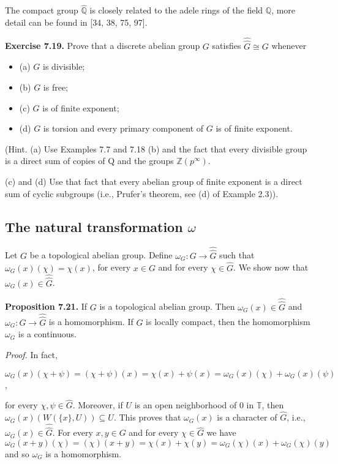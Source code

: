 \documentclass[12pt]{article}
\begin{document}
\begin{itemize}
\begin{itemize}
    The compact group $\hat{\mathbb{Q}}$ is closely related to the adele rings of the field $\mathbb{Q}$, more detail can be found in
[34, 38, 75, 97].
    

\textbf{Exercise 7.19.} Prove that a discrete abelian group $G$ satisfies $\hat{\hat{G}} \cong G$ whenever

\begin{itemize}

    \item (a) $G$ is divisible;

    \item (b) $G$ is free;

    \item (c) $G$ is of finite exponent;

    \item (d) $G$ is torsion and every primary component of $G$ is of finite exponent.

\end{itemize}

    (Hint. (a) Use Examples 7.7 and 7.18 (b) and the fact that every divisible group is a direct sum of copies of
Q and the groups $\mathbb{Z}(p^{\infty})$.


    (c) and (d) Use that fact that every abelian group of finite exponent is a direct sum of cyclic subgroups (i.e.,
Prufer's theorem, see (d) of Example 2.3)).


\subsection{The natural transformation $\omega$}


Let $G$ be a topological abelian group. Define $\omega_G : G \to \hat{\hat{G}}$ such that $\omega_G(x)(\chi) = \chi(x)$, for every $x \in G$ and for
every $\chi \in \hat{G}$. We show now that $\omega_G (x) \in \hat{\hat{G}}$.


\textbf{Proposition 7.21.} If $G$ is a topological abelian group. Then $\omega_G (x) \in \hat{\hat{G}}$ and $\omega_G : G \to \hat{\hat{G}}$ is a homomorphism.
If $G$ is locally compact, then the homomorphism $\omega_G$ is a continuous.


\emph{Proof.} In fact, 

    
    $\omega_G(x)(\chi + \psi) = (\chi + \psi)(x) = \chi (x) + \psi (x) = \omega_G(x)(\chi) + \omega_G(x)(\psi)$,


for every $\chi, \psi \in \hat{G}$. Moreover, if $U$ is an open neighborhood of 0 in $\mathbb{T}$, then $\omega_G(x)(W(\{x\}, U)) \subseteq U$. This
proves that $\omega_G(x)$ is a character of $\hat{G}$, i.e., $\omega_G(x) \in \hat{\hat{G}}$. For every $x, y \in G$ and for every $\chi \in \hat{G}$ we have
$\omega_G(x + y)(\chi) = (\chi)(x + y) = \chi(x) + \chi(y) = \omega_G(\chi)(x) + \omega_G(\chi)(y)$ and so $\omega_G$ is a homomorphism.



\end{itemize}
\end{itemize}
\end{document}
